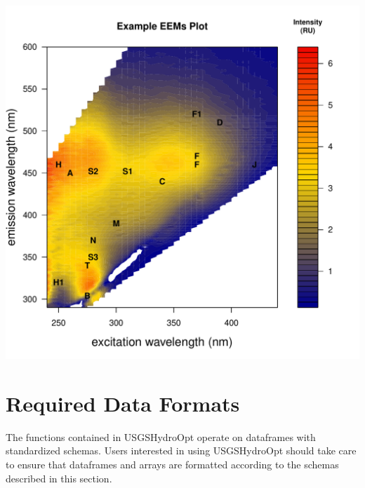 \documentclass[a4paper,11pt]{article}\usepackage[]{graphicx}\usepackage[]{color}
\makeatletter
\def\maxwidth{ %
  \ifdim\Gin@nat@width>\linewidth
    \linewidth
  \else
    \Gin@nat@width
  \fi
}
\newenvironment{knitrout}{}{} %
\makeatother
\begin{document}
\begin{knitrout}
\color{fgcolor}
\includegraphics[width=\maxwidth]{figure/unnamed-chunk-3} 

\end{knitrout}

\section{Required Data Formats}
The functions contained in USGSHydroOpt operate on dataframes with standardized schemas. Users interested in using USGSHydroOpt should take care to ensure that dataframes and arrays are formatted according to the schemas described in this section.

\end{document}
